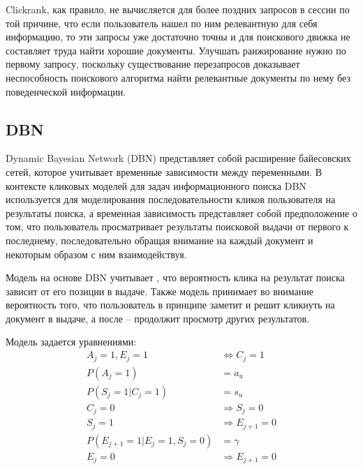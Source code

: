 \documentclass[diploma]{nanolab2015}
\begin{document}
Clickrank, как правило, не вычисляется для более поздних запросов в сессии по той причине, что если пользователь нашел по ним релевантную для себя информацию, то эти запросы уже достаточно точны и для поискового движка не составляет труда найти хорошие документы. Улучшать ранжирование нужно по первому запросу, поскольку существование перезапросов доказывает неспособность поискового алгоритма найти релевантные документы по нему без поведенческой информации.

\subsection{DBN}
Dynamic Bayesian Network (DBN) представляет собой расширение байесовских сетей, которое учитывает временные зависимости между переменными. В контексте кликовых моделей для задач информационного поиска DBN используется для моделирования последовательности кликов пользователя на результаты поиска, а временная зависимость представляет собой предположение о том, что пользователь просматривает результаты поисковой выдачи от первого к последнему, последовательно обращая внимание на каждый документ и некоторым образом с ним взаимодействуя.

Модель на основе DBN учитывает \cite{DBN}, что вероятность клика на результат поиска зависит от его позиции в выдаче. Также модель принимает во внимание вероятность того, что пользователь в принципе заметит и решит кликнуть на документ в выдаче, а после -- продолжит просмотр других результатов.

Модель задается уравнениями:
\begin{align}
  A_j = 1, E_j = 1                  & \Leftrightarrow C_j = 1 \label{dbn:1} \\
  P(A_j = 1)                        & = a_u                  \label{dbn:2}  \\
  P(S_j = 1| C_j = 1)               & = s_u                   \label{dbn:3} \\
  C_j = 0                           & \Rightarrow S_j = 0 \label{dbn:4}     \\
  S_j = 1                           & \Rightarrow E_{j+1} = 0 \label{dbn:5} \\
  P(E_{j+1} = 1 | E_j = 1, S_j = 0) & = \gamma                \label{dbn:6} \\
  E_j = 0                           & \Rightarrow E_{j+1} = 0 \label{dbn:7}
\end{align}
\end{document}
